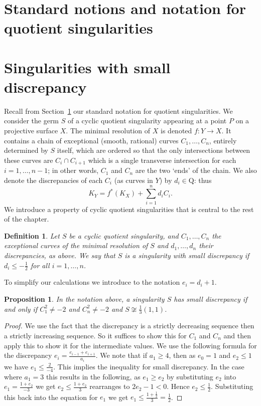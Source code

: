 \documentclass[12pt,a4paper]{book}      %
\newtheorem{prop}[thm]{Proposition}
\newtheorem{dfn}[thm]{Definition}
\newcommand{\Q}{\mathrm{Q}}
\begin{document}
\section{Standard notions and notation for quotient singularities}
\label{sec!notation}

\section{Singularities with small discrepancy}

Recall from Section~\ref{sec!notation} our standard notation for quotient singularities.
We consider the germ $S$ of a cyclic quotient singularity appearing at a point $P$ on a 
projective surface $X$.
The minimal resolution of $X$ is denoted $f\colon Y \longrightarrow X$. It contains a chain of
exceptional (smooth, rational)
curves $C_1,\dots,C_n$, entirely determined by $S$ itself, which are ordered so
that the only intersections between these curves are
$C_i\cap C_{i+1}$ which is a single transverse intersection for each $i=1,\dots,n-1$; 
in other words,
$C_1$ and $C_n$ are the two `ends' of the chain.
We also denote the discrepancies of each $C_i$ (as curves in $Y$) by $d_i\in\Q$: thus
\[
K_Y = f^*(K_X) + \sum_{i=1}^n d_i C_i.
\]
We introduce a property of cyclic quotient singularities that is central to the rest of the chapter.
\begin{dfn}
Let $S$ be a cyclic quotient singularity, and $C_1, \dots ,C_n$ the exceptional curves of the minimal resolution of $S$ and $d_1, \dots,d_n$ their discrepancies, as above.
We say that $S$ is a \emph{singularity with small discrepancy} if $d_i \leq -\frac{1}{2}$ for
all $i=1,\dots,n$.
\end{dfn}

To simplify our calculations we introduce to the notation $e_i = d_i + 1$. 

\begin{prop}
In the notation above,
a singularity $S$ has small discrepancy if and only if $C_1^2 \neq -2$ and $C_n^2 \neq -2$ and $ S \not\cong \frac{1}{3}(1,1)$.
\end{prop}
\begin{proof}
 We use the fact that the discrepancy is a strictly decreasing sequence then a strictly increasing sequence. So it suffices to show this for $C_1$ and $C_n$ and then apply this to show it for the intermediate values. We use the following formula for the discrepancy $e_i =  \frac{e_{i-1}+e_{i+1}}{a_i}$. We note that if $a_1 \geq 4$, then as $e_0 = 1$ and $e_2 \leq 1$ we have $e_1 \leq \frac{2}{-4}$. This implies the inequality for small discrepancy. In the case where $a_1 = 3$ this results in the following, as $e_1 \geq e_2$ by substituting $e_2$ into $e_1 = \frac{1 + e_2}{-3}$ we get  $ e_2 \leq \frac{1 + e_2}{3}$ rearranges to $2e_2 - 1 < 0$. Hence $e_2 \leq \frac{1}{2}$. Substituting this back into the equation for $e_1$ we get $e_1 \leq  \frac{1+ \frac{1}{2}}{3} =  \frac{1}{2}$. 
 \end{proof}
\end{document}

